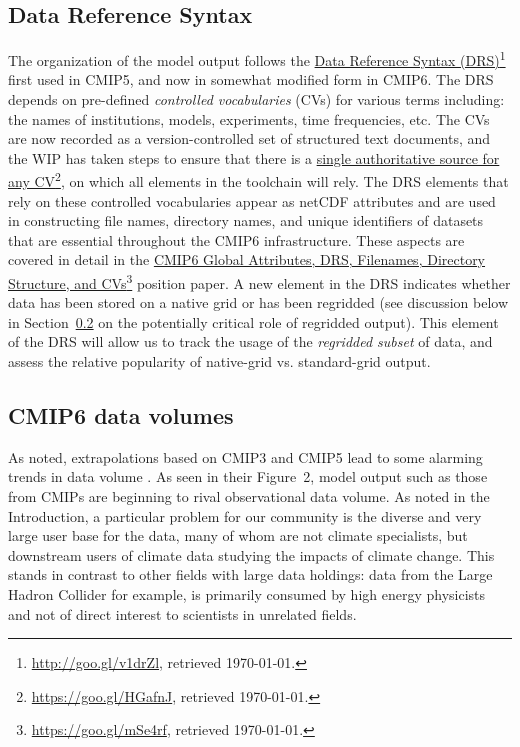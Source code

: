 \documentclass[gmd,manuscript]{copernicus}
\newcommand{\pllabel}[1]{\label{p-#1}\linelabel{l-#1}}
\newcommand{\urlref}[2] {\href{#1}{#2}\footnote{\url{#1}, retrieved \today.}}
\begin{document}
\subsection{Data Reference Syntax}
\label{sec:data-drs}

The organization of the model output follows the
\urlref{http://goo.gl/v1drZl}{Data Reference Syntax (DRS)} first used
in CMIP5, and now in somewhat modified form in CMIP6. The DRS depends
on pre-defined \emph{controlled vocabularies} (CVs) for various terms
including: the names of institutions, models, experiments, time
frequencies, etc. The CVs are now recorded as a version-controlled set
of structured text documents, and the WIP has taken steps to ensure
that there is a \urlref{https://goo.gl/HGafnJ}{single authoritative
  source for any CV}, on which all elements in the toolchain will
rely. The DRS elements that rely on these controlled vocabularies
appear as netCDF attributes and are used in constructing file names,
directory names, and unique identifiers of datasets that are essential
throughout the CMIP6 infrastructure. These aspects are covered in
detail in the \urlref{https://goo.gl/mSe4rf}{CMIP6 Global Attributes,
  DRS, Filenames, Directory Structure, and CVs} position paper. A new
element in the DRS indicates whether data has been stored on a native
grid or has been regridded (see discussion below in
Section~\ref{sec:dvol} on the potentially critical role of regridded
output). This element of the DRS will allow us to track the usage of
the \emph{regridded subset} of data, and assess the relative
popularity of native-grid vs. standard-grid output.

\subsection{CMIP6 data volumes}
\label{sec:dvol}

As noted, extrapolations based on CMIP3 and CMIP5 lead to some
alarming trends in data volume \citep[see
e.g.,][]{ref:overpecketal2011}.
\pllabel{RC3-10}
As seen in their Figure~2, model output such as those from CMIPs are
beginning to rival observational data volume. As noted in the
Introduction, a particular problem for our community is the diverse
and very large user base for the data, many of whom are not climate
specialists, but downstream users of climate data studying the impacts
of climate change. This stands in contrast to other fields with large
data holdings: data from the Large Hadron Collider
\citep[e.g.,][]{ref:aadetal2008} for example, is primarily consumed by
high energy physicists and not of direct interest to scientists in
unrelated fields.
\end{document}
